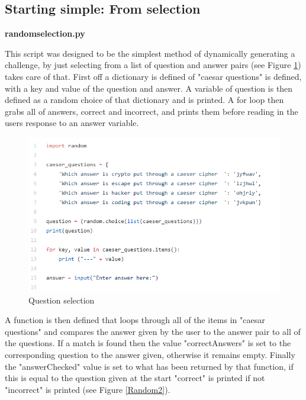 \documentclass[12pt,a4paper]{article}
\begin{document}

\subsection{Starting simple: From selection}  
\textbf{random\textunderscore selection.py}  

This script was designed to be the simplest method of dynamically generating a challenge, by just selecting from a list of question and answer pairs (see Figure \ref{Random1}) takes care of that. First off a dictionary is defined of "caesar questions" is defined, with a key and value of the question and answer. A variable of question is then defined as a random choice of that dictionary and is printed. A for loop then grabs all of answers, correct and incorrect, and prints them before reading in the users response to an answer variable. 

\begin{figure}[!ht]
    \centering
    \includegraphics[width=1.0\textwidth]{Figs/random1.PNG} 
    \caption{Question selection} 
    \label{Random1}
\end{figure}   

A function is then defined that loops through all of the items in "caesar questions" and compares the answer given by the user to the answer pair to all of the questions. If a match is found then the value "correctAnswers" is set to the corresponding question to the answer given, otherwise it remains empty. Finally the "answerChecked" value is set to what has been returned by that function, if this is equal to the question given at the start "correct" is printed if not "incorrect" is printed (see Figure \ref{Random2}).
\end{document}
